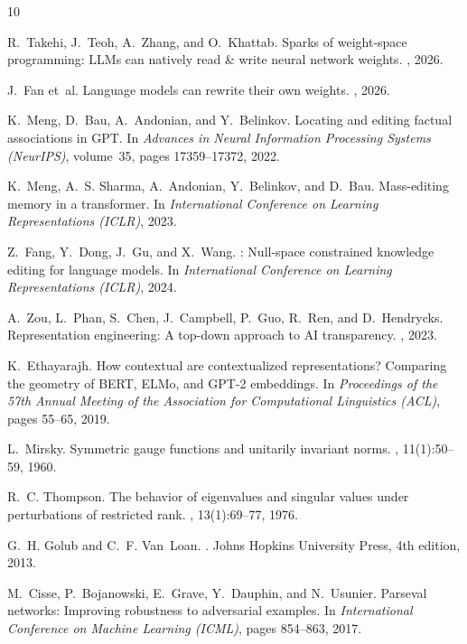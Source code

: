 \documentclass[11pt,a4paper]{article}
\begin{document}

\begin{thebibliography}{10}

R.~Takehi, J.~Teoh, A.~Zhang, and O.~Khattab.
\newblock Sparks of weight-space programming: {LLMs} can natively read \& write neural network weights.
, 2026.

J.~Fan et~al.
\newblock Language models can rewrite their own weights.
, 2026.

K.~Meng, D.~Bau, A.~Andonian, and Y.~Belinkov.
\newblock Locating and editing factual associations in {GPT}.
\newblock In {\em Advances in Neural Information Processing Systems (NeurIPS)}, volume~35, pages 17359--17372, 2022.

K.~Meng, A.~S. Sharma, A.~Andonian, Y.~Belinkov, and D.~Bau.
\newblock Mass-editing memory in a transformer.
\newblock In {\em International Conference on Learning Representations (ICLR)}, 2023.

Z.~Fang, Y.~Dong, J.~Gu, and X.~Wang.
: Null-space constrained knowledge editing for language models.
\newblock In {\em International Conference on Learning Representations (ICLR)}, 2024.

A.~Zou, L.~Phan, S.~Chen, J.~Campbell, P.~Guo, R.~Ren, and D.~Hendrycks.
\newblock Representation engineering: A top-down approach to {AI} transparency.
, 2023.

K.~Ethayarajh.
\newblock How contextual are contextualized representations? Comparing the geometry of {BERT}, {ELMo}, and {GPT-2} embeddings.
\newblock In {\em Proceedings of the 57th Annual Meeting of the Association for Computational Linguistics (ACL)}, pages 55--65, 2019.

L.~Mirsky.
\newblock Symmetric gauge functions and unitarily invariant norms.
, 11(1):50--59, 1960.

R.~C. Thompson.
\newblock The behavior of eigenvalues and singular values under perturbations of restricted rank.
, 13(1):69--77, 1976.

G.~H. Golub and C.~F. Van~Loan.
.
\newblock Johns Hopkins University Press, 4th edition, 2013.

M.~Cisse, P.~Bojanowski, E.~Grave, Y.~Dauphin, and N.~Usunier.
\newblock Parseval networks: Improving robustness to adversarial examples.
\newblock In {\em International Conference on Machine Learning (ICML)}, pages 854--863, 2017.

\end{thebibliography}
\end{document}
